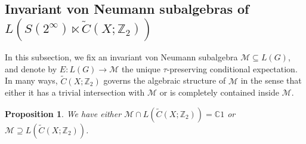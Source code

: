 \documentclass[11pt]{amsart}
\theoremstyle{plain}
\newtheorem{proposition}[theorem]{Proposition}
\theoremstyle{definition}
\theoremstyle{remark}
\numberwithin{equation}{section}
\begin{document}
\subsection*{Invariant von Neumann subalgebras of $L(S(2^\infty)\ltimes \widetilde C(X;\mathbb{Z}_2))$}
In this subsection, we fix an invariant von Neumann subalgebra $\mathcal{M}\subseteq L(G)$, and denote by $E:L(G) \to \mathcal{M}$ the unique $\tau$-preserving conditional expectation. In many ways, $\widetilde C(X;\mathbb Z_2)$ governs the algebraic structure of $\mathcal{M}$ in the sense that either it has a trivial intersection with $\mathcal{M}$ or is completely contained inside $\mathcal{M}$.
\begin{proposition}\label{prop: M intersect L(widetilde C(X))}
We have either $\mathcal M\cap L(\widetilde C(X;\mathbb{Z}_2))=\mathbb C 1$ or $\mathcal M\supseteq L(\widetilde C(X;\mathbb{Z}_2))$.
\end{proposition}
\end{document}
